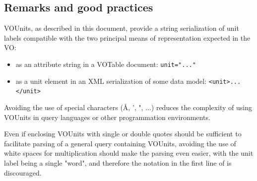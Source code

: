 \documentclass[12pt,notitlepage,onecolumn]{ivoa}
\def\eg{e.g.~}
\begin{document}
%
%
%
%

\subsection{Remarks and good practices}

VOUnits, as described in this document, provide a string serialization of
unit labels compatible with the two principal
means of representation expected in the VO:
\begin{itemize}
\item as an attribute string in a VOTable document: \verb|unit="..."|
\item as a unit element in an XML serialization of some data model: \verb|<unit>...</unit>|
\end{itemize}

Avoiding the use of special characters (\AA, ', ", ...) reduces the
complexity of using VOUnits in query languages or other programmation environments.

Even if enclosing VOUnits with single or double quotes should be sufficient to
facilitate parsing of a general query containing VOUnits, avoiding the use of
white spaces for multiplication should
make the parsing even easier, with the unit label being a single "word", and therefore
the notation in the first line of  is discouraged.
\end{document}

